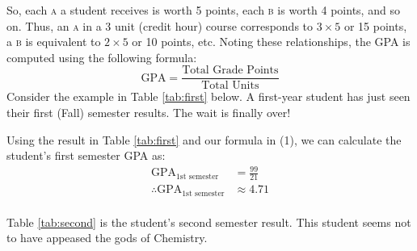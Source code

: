 \documentclass[letter]{article}
\begin{document}
So, each \textsc{a} a student receives is worth 5 points, each \textsc{b} is worth 4 points, and so on. Thus, an \textsc{a} in a 3 unit (credit hour) course corresponds to $3\times5$ or 15 points, a \textsc{b} is equivalent to $2\times5$ or 10 points, etc. Noting these relationships, the GPA is computed using the following formula:
\begin{equation}
	\text{GPA} = \frac{\text{Total Grade Points}}{\text{Total Units}}
\end{equation}
Consider the example in Table \ref{tab:first} below. A first-year student has just seen their first (Fall) semester results. The wait is finally over!
\begin{table}[h]
	\centering
	\label{tab:first}
\end{table}

Using the result in Table \ref{tab:first} and our formula in (1), we can calculate the student's first semester GPA as:
\begin{align*}
	\text{GPA}_{\text{1st semester}}            & = \frac{99}{21} \\
	\therefore \text{GPA}_{\text{1st semester}} & \approx 4.71    \\
\end{align*}

Table \ref{tab:second} is the student's second semester result. This student seems not to have appeased the gods of Chemistry.
\end{document}

